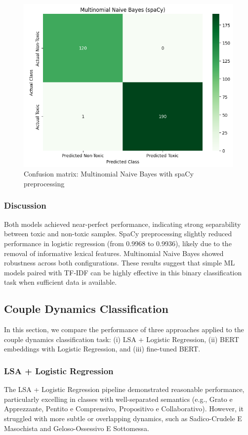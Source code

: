 \documentclass[conference]{IEEEtran}
\begin{document}
\begin{figure}[H]
  \centering
  \includegraphics[width=0.9\columnwidth]{figures/confusion_nb_spacy.png}
  \caption{Confusion matrix: Multinomial Naive Bayes with spaCy preprocessing}
\end{figure}

\subsubsection{Discussion}

Both models achieved near-perfect performance, indicating strong separability between toxic and non-toxic samples. SpaCy preprocessing slightly reduced performance in logistic regression (from 0.9968 to 0.9936), likely due to the removal of informative lexical features. Multinomial Naive Bayes showed robustness across both configurations. These results suggest that simple ML models paired with TF‑IDF can be highly effective in this binary classification task when sufficient data is available.

\subsection{Couple Dynamics Classification}

In this section, we compare the performance of three approaches applied to the couple dynamics classification task: (i) LSA + Logistic Regression, (ii) BERT embeddings with Logistic Regression, and (iii) fine-tuned BERT.

\subsubsection{LSA + Logistic Regression}
\noindent
The LSA + Logistic Regression pipeline demonstrated reasonable performance, particularly excelling in classes with well-separated semantics (e.g., Grato e Apprezzante, Pentito e Comprensivo, Propositivo e Collaborativo). However, it struggled with more subtle or overlapping dynamics, such as Sadico-Crudele E Masochista and Geloso-Ossessivo E Sottomessa.
\end{document}
